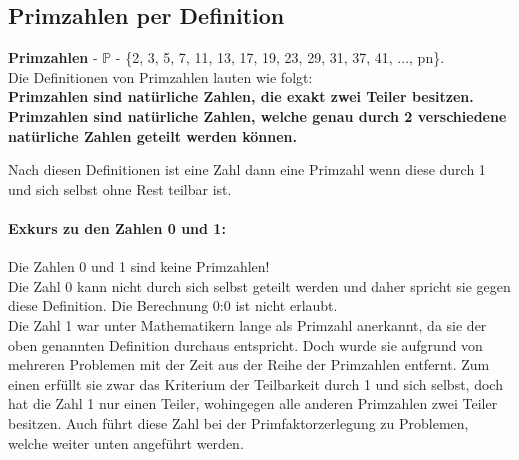\documentclass[german,12pt,a4paper]{article}
\begin{document}
\subsection{Primzahlen per Definition}
\textbf{Primzahlen} - $\mathbb{P}$ - \{2, 3, 5, 7, 11, 13, 17, 19, 23, 29, 31, 37, 41, ..., pn\}.\\
Die Definitionen von Primzahlen lauten wie folgt:\\
\hspace*{5mm}\textbf{Primzahlen sind natürliche Zahlen, die exakt zwei Teiler besitzen.}\\
\hspace*{5mm}\textbf{Primzahlen sind natürliche Zahlen, welche genau durch 2 verschiedene natürliche Zahlen geteilt werden können.}

Nach diesen Definitionen ist eine Zahl dann eine Primzahl wenn diese durch 1 und sich selbst ohne Rest teilbar ist.
\paragraph{Exkurs zu den Zahlen 0 und 1:}Die Zahlen 0 und 1 sind keine Primzahlen!\\
Die Zahl 0 kann nicht durch sich selbst geteilt werden und daher spricht sie gegen diese Definition. Die Berechnung 0:0 ist nicht erlaubt.\\
Die Zahl 1 war unter Mathematikern lange als Primzahl anerkannt, da sie der oben genannten Definition durchaus entspricht. Doch wurde sie aufgrund von mehreren Problemen mit der Zeit aus der Reihe der Primzahlen entfernt. Zum einen erfüllt sie zwar das Kriterium der Teilbarkeit durch 1 und sich selbst, doch hat die Zahl 1 nur einen Teiler, wohingegen alle anderen Primzahlen zwei Teiler besitzen. Auch führt diese Zahl bei der Primfaktorzerlegung zu Problemen, welche weiter unten angeführt werden.
\end{document}
